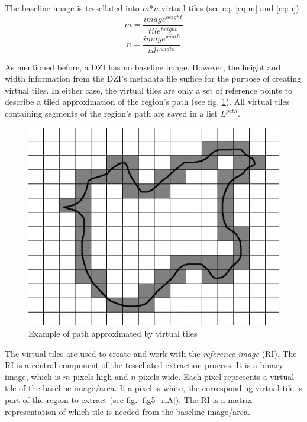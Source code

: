The baseline image is tessellated into $m$*$n$ virtual tiles (see eq. \ref{eq:m} and \ref{eq:n}). 
\begin{equation}\label{eq:m}
m = \frac{image^{height}}{tile^{height}}
\end{equation}
\begin{equation}\label{eq:n}
n = \frac{image^{width}}{tile^{width}}
\end{equation}

As mentioned before, a DZI has no baseline image. However, the height and width information from the DZI's metadata file suffice for the purpose of creating virtual tiles. In either case, the virtual tiles are only a set of reference points to describe a tiled approximation of the region's path (see fig. \ref{fig5_vtExample}). All virtual tiles containing segments of the region's path are saved in a list $L^{path}$.

\begin{figure}[!h]
	\begin{center}
		\includegraphics[scale=0.35]{img/virtualTiles.png}
		\caption{Example of path approximated by virtual tiles}
		\label{fig5_vtExample}
	\end{center}
\end{figure}

The virtual tiles are used to create and work with the \emph{reference image} (RI). The RI is a central component of the tessellated extraction process. It is a binary image, which is $m$ pixels high and $n$ pixels wide. Each pixel represents a virtual tile of the baseline image/area. If a pixel is white, the corresponding virtual tile is part of the region to extract (see fig. \ref{fig5_riA}). The RI is a matrix representation of which tile is needed from the baseline image/area.

